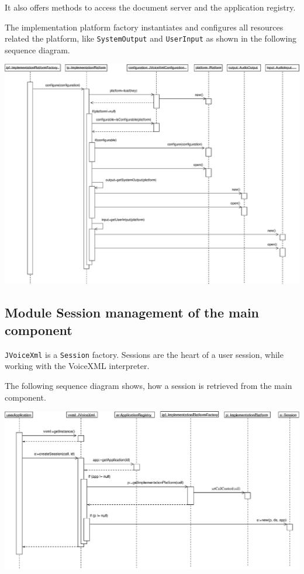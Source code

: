\documentclass[11pt,a4paper]{article}
\begin{document}
It also offers methods to access the document server and the application
registry.

The implementation platform factory instantiates and configures all
resources related the platform, like \texttt{SystemOutput} and
\texttt{UserInput} as shown in the following sequence diagram.

\begin{center}
\includegraphics[scale=0.35]{seq-implementation.eps}
\end{center}

\subsection{Module Session management of the main component}

\texttt{JVoiceXml} is a \texttt{Session} factory\cite{gamma:design_patterns}. 
Sessions are the heart of a user session, while working with the VoiceXML 
interpreter.

The following sequence diagram shows, how a session is retrieved
from the main component.

\begin{center}
\includegraphics[scale=0.4]{seq-jvoicexml-sessionfactory.eps}
\end{center}
\end{document}
